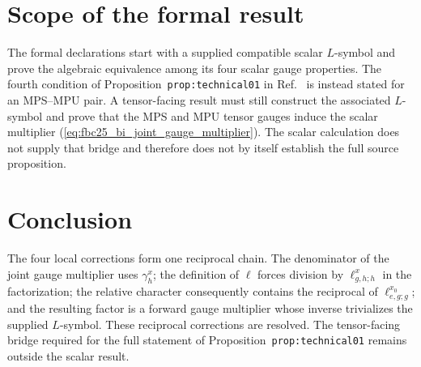\documentclass{article}
\begin{document}
\section{Scope of the formal result}

The formal declarations start with a supplied compatible scalar $L$-symbol and
prove the algebraic equivalence among its four scalar gauge properties. The
fourth condition of Proposition~\texttt{prop:technical01} in
Ref.~\cite{FrancoRubio2025MPUGauging} is instead stated for an MPS--MPU pair.
A tensor-facing result must still construct the associated $L$-symbol and prove
that the MPS and MPU tensor gauges induce the scalar multiplier
(\ref{eq:fbc25_bi_joint_gauge_multiplier}). The scalar calculation does not
supply that bridge and therefore does not by itself establish the full source
proposition.

\section{Conclusion}

The four local corrections form one reciprocal chain. The denominator of the
joint gauge multiplier uses $\gamma_h^x$; the definition of $\ell$ forces
division by $\ell^x_{g,h;h}$ in the factorization; the relative character
consequently contains the reciprocal of $\ell^{x_0}_{e,g;g}$; and the resulting
factor is a forward gauge multiplier whose inverse trivializes the supplied
$L$-symbol. These reciprocal corrections are resolved. The tensor-facing bridge
required for the full statement of Proposition~\texttt{prop:technical01}
remains outside the scalar result.



\end{document}
